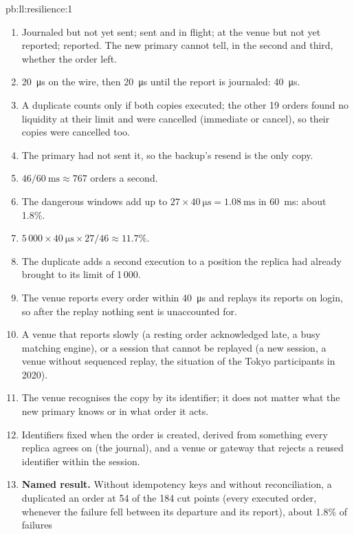 \begin{solution}{pb:ll:resilience:1}
\begin{enumerate}
\item Journaled but not yet sent; sent and in flight; at the venue but not yet reported; reported. The new primary cannot tell,
in the second and third, whether the order left.
\item \qty{20}{\micro\second} on the wire, then \qty{20}{\micro\second} until the report is journaled: \qty{40}{\micro\second}.
\item A duplicate counts only if both copies executed; the other 19 orders found no liquidity at their limit and were
cancelled (immediate or cancel), so their copies were cancelled too.
\item The primary had not sent it, so the backup's resend is the only copy.
\item $46 / \qty{60}{\milli\second} \approx 767$ orders a second.
\item The dangerous windows add up to $27 \times \qty{40}{\micro\second} = \qty{1.08}{\milli\second}$ in
\qty{60}{\milli\second}: about 1.8\%.
\item $5\,000 \times \qty{40}{\micro\second} \times 27/46 \approx 11.7\%$.
\item The duplicate adds a second execution to a position the replica had already brought to its limit of 1\,000.
\item The venue reports every order within \qty{40}{\micro\second} and replays its reports on login, so after the replay
nothing sent is unaccounted for.
\item A venue that reports slowly (a resting order acknowledged late, a busy matching engine), or a session that cannot be
replayed (a new session, a venue without sequenced replay, the situation of the Tokyo participants in 2020).
\item The venue recognises the copy by its identifier; it does not matter what the new primary knows or in what order it acts.
\item Identifiers fixed when the order is created, derived from something every replica agrees on (the journal), and a venue
or gateway that rejects a reused identifier within the session.
\item \textbf{Named result.} Without idempotency keys and without reconciliation, a  duplicated an order at 54 of the
184 cut points (every executed order, whenever the failure fell between its departure and its report), about 1.8\% of failures

\end{enumerate}
\end{solution}
